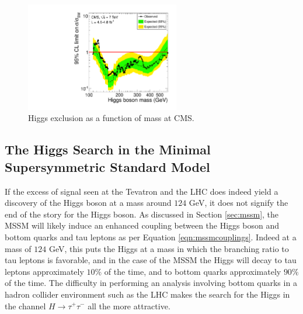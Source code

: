\begin{figure}[htpb]
\label{fig:lhcexclusion}
\begin{center}
\centerline{\includegraphics[width=0.60\textwidth]{plots/cmshiggs.pdf}}
\caption{Higgs exclusion as a function of mass at CMS\cite{CMSHIGGS}.}
\label{fig:lhcexclusion}
\end{center}
\end{figure}

\subsection{The Higgs Search in the Minimal Supersymmetric Standard Model}
If the excess of signal seen at the Tevatron and the LHC does indeed yield a discovery of the Higgs boson at a mass around $124$ GeV, it does not signify the end of the story for the Higgs boson.
As discussed in Section \ref{sec:mssm}, the MSSM will likely induce an enhanced coupling between the Higgs boson and bottom quarks and tau leptons as per Equation \ref{eqn:mssmcouplings}.
Indeed at a mass of $124$ GeV, this puts the Higgs at a mass in which the branching ratio to tau leptons is favorable, and in the case of the MSSM the Higgs will decay to tau leptons approximately $10\%$ of the time, and to bottom quarks approximately $90\%$ of the time.
The difficulty in performing an analysis involving bottom quarks in a hadron collider environment such as the LHC makes the search for the Higgs in the channel $H\rightarrow\tau^{+}\tau^{-}$ all the more attractive.

